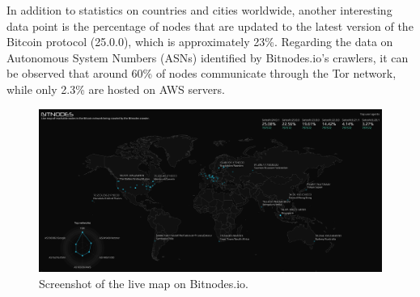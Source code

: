\noindent In addition to statistics on countries and cities worldwide, another interesting data point is the percentage of nodes that are updated to the latest version of the Bitcoin protocol (25.0.0), which is approximately 23\%. Regarding the data on Autonomous System Numbers (ASNs) identified by Bitnodes.io's crawlers, it can be observed that around 60\% of nodes communicate through the Tor network, while only 2.3\% are hosted on AWS servers.

\begin{figure}[h!]
\centering
\includegraphics[width=15cm]{Figures/bitcoin/bitmap1.png}
\caption{Screenshot of the live map on Bitnodes.io.}
\label{fig:live_map}
\end{figure}